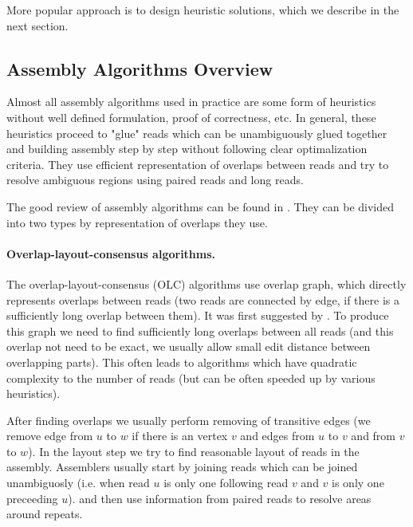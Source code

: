 More popular approach is to design heuristic solutions, which we describe in the next
section.

\subsection{Assembly Algorithms Overview}

Almost all assembly algorithms used in practice are some form of heuristics
without well defined formulation, proof of correctness, etc.
In general, these heuristics proceed to "glue" reads which can be
unambiguously glued together and building assembly step by step
without following clear optimalization criteria.
They use efficient representation of overlaps between reads and try to resolve
ambiguous regions using paired reads and long reads.

The good review of assembly algorithms can be found in \citet{miller2010assembly}.
They can be divided into two types by representation of overlaps they use.

\paragraph{Overlap-layout-consensus algorithms.}
The overlap-layout-consensus (OLC) algorithms use overlap graph, which directly represents
overlaps between reads (two reads are connected by edge, if there is a sufficiently long overlap between them). It was first suggested by \citet{myers1995toward}.
To produce this graph we need to find sufficiently long
overlaps between all reads (and this overlap not need to be exact, we usually allow small edit distance between overlapping parts). This often leads to algorithms which have quadratic
complexity to the number of reads (but can be often speeded up by various heuristics).

After finding overlaps we usually perform removing of transitive edges (we remove edge
from $u$ to $w$ if there is an vertex $v$ and edges from $u$ to $v$ and from $v$ to $w$).
In the layout step we try to find reasonable layout of reads in the assembly.
Assemblers usually start by joining reads which can be joined unambiguosly (i.e.
when read $u$ is only one following read $v$ and $v$ is only one preceeding $u$).
and then use information from paired reads to resolve areas around repeats.

